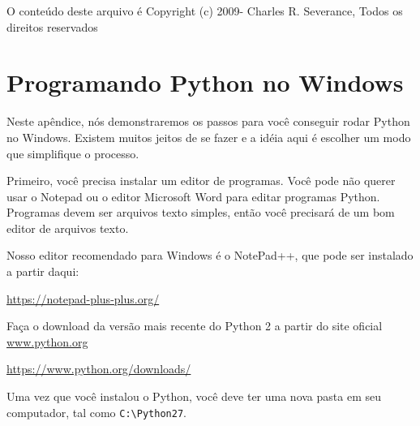   O conteúdo deste arquivo é
  Copyright (c) 2009-  Charles R. Severance, Todos os direitos reservados

\chapter{Programando Python no Windows}
%

Neste apêndice, nós demonstraremos os passos para você
conseguir rodar Python no Windows. Existem muitos jeitos
de se fazer e a idéia aqui é escolher um modo que simplifique
o processo.
%

Primeiro, você precisa instalar um editor de programas.
Você pode não querer usar o Notepad ou o editor Microsoft
Word para editar programas Python. Programas devem ser arquivos
texto simples, então você precisará de um bom editor de arquivos
texto.
%

Nosso editor recomendado para Windows é o NotePad++, que pode
ser instalado a partir daqui:
%

\url{https://notepad-plus-plus.org/}

Faça o download da versão mais recente do Python 2 a partir
 do site oficial \url{www.python.org}

\url{https://www.python.org/downloads/}

Uma vez que você instalou o Python, você deve ter uma nova
pasta em seu computador, tal como {\tt C:{\textbackslash}Python27}.
%

